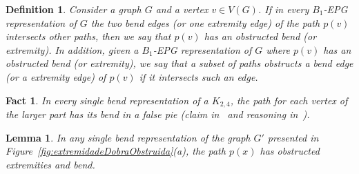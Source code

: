 \documentclass[9pt]{entcs}
\newtheorem{lema}{Lemma}[section]
\newtheorem{defi}{Definition}[section]
\newtheorem{fac}{Fact}[section]
\newtheorem{prove}{Proof}[section]
\begin{document}




\begin{defi}
Consider a graph $G$ and a vertex $v \in V(G)$. If in every $B_1$-EPG representation of $G$ the two bend edges (or one extremity edge) of the path $p(v)$ intersects other paths, then we say that $p(v)$ has an \emph{obstructed bend (or extremity)}. 
In addition, given a $B_1$-EPG representation of $G$ where $p(v)$ has an obstructed bend (or extremity), we say that a subset of paths \emph{obstructs} a bend edge (or a extremity edge) of $p(v)$ if it intersects such an edge. 
\end{defi}


\begin{fac} \label{fact:k24facts}
In every single bend representation of a $K_{2,4}$, the path for each vertex of the larger part has its bend in a false pie (claim in~\cite{daniel2014b} and reasoning in~\cite{Asinowski2009}).
\end{fac}


\begin{lema}\label{lem:obstrucao}
In any single bend representation of the graph $G'$ presented in Figure~\ref{fig:extremidadeDobraObstruida}(a), the path $p(x)$ has obstructed extremities and bend.
\end{lema}


\end{document}
